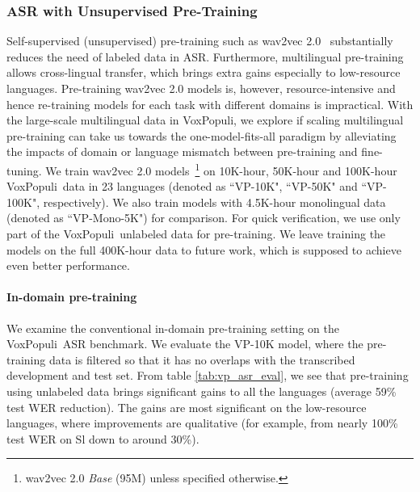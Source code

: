 \documentclass[11pt,a4paper]{article}
\newcommand{\vp}{VoxPopuli}
\begin{document}
\subsubsection{ASR with Unsupervised Pre-Training}
\label{sec:unsupervised_pretraining}
Self-supervised (unsupervised) pre-training such as wav2vec 2.0~\citep{baevski2020wav2vec} substantially reduces the need of labeled data in ASR. Furthermore, multilingual pre-training~\citep{conneau2020unsupervised} allows cross-lingual transfer, which brings extra gains especially to low-resource languages. Pre-training wav2vec 2.0 models is, however, resource-intensive and hence re-training models for each task with different domains is impractical. With the large-scale multilingual data in \vp,
we explore if scaling multilingual pre-training can take us towards the one-model-fits-all paradigm by alleviating the impacts of domain or language mismatch between pre-training and fine-tuning. We train wav2vec 2.0 models~\footnote{wav2vec 2.0 \emph{Base} (95M) unless specified otherwise.} on 10K-hour, 50K-hour and 100K-hour \vp~data in 23 languages (denoted as ``VP-10K", ``VP-50K" and ``VP-100K", respectively). We also train models with 4.5K-hour monolingual data (denoted as ``VP-Mono-5K") for comparison. For quick verification, we use only part of the \vp~unlabeled data for pre-training. We leave training the models on the full 400K-hour data to future work, which is supposed to achieve even better performance.

\paragraph{In-domain pre-training} We examine the conventional in-domain pre-training setting on the \vp~ASR benchmark. We evaluate the VP-10K model, where the pre-training data is filtered so that it has no overlaps with the transcribed development and test set. From table \ref{tab:vp_asr_eval}, we see that pre-training using unlabeled data brings significant gains to all the languages (average 59\% test WER reduction). The gains are most significant on the low-resource languages, where improvements are qualitative (for example, from nearly 100\% test WER on Sl down to around 30\%).
\end{document}
